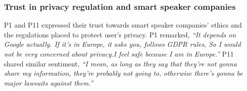     \subsubsection{Trust in privacy regulation and smart speaker companies}
        P1 and P11 expressed their trust towards smart speaker companies' ethics and the regulations placed to protect user's privacy.
        P1 remarked,    
            \textit{``It depends on Google actually. If it’s in Europe, it asks you, follows \ac{GDPR} rules, So I would not be very concerned about privacy.I feel safe because I am in Europe.''}
        P11 shared similar sentiment,
        \textit{``I mean, as long as they say that they're not gonna share my information, they're probably not going to, otherwise there's gonna be major lawsuits against them.'' }
        
    

        
